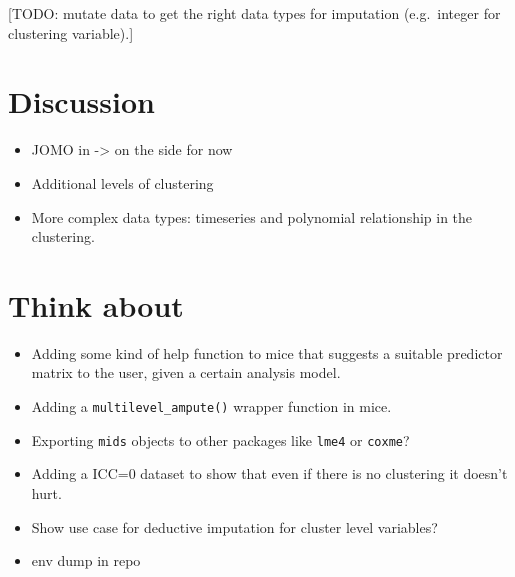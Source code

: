 \documentclass[
]{jss}
\begin{document}
{[}TODO: mutate data to get the right data types for imputation
(e.g.~integer for clustering variable).{]}

\hypertarget{discussion}{%
\section{Discussion}\label{discussion}}

\begin{itemize}
\item
  JOMO in  -\textgreater{} on the side for now
\item
  Additional levels of clustering
\item
  More complex data types: timeseries and polynomial relationship in the
  clustering.
\end{itemize}

\hypertarget{think-about}{%
\section{Think about}\label{think-about}}

\begin{itemize}
\item
  Adding some kind of help function to mice that suggests a suitable
  predictor matrix to the user, given a certain analysis model.
\item
  Adding a \texttt{multilevel\_ampute()} wrapper function in mice.
\item
  Exporting \texttt{mids} objects to other packages like \texttt{lme4}
  or \texttt{coxme}?
\item
  Adding a ICC=0 dataset to show that even if there is no clustering it
  doesn't hurt.
\item
  Show use case for deductive imputation for cluster level variables?
\item
  env dump in repo
\end{itemize}

\renewcommand\refname{References}

\end{document}
